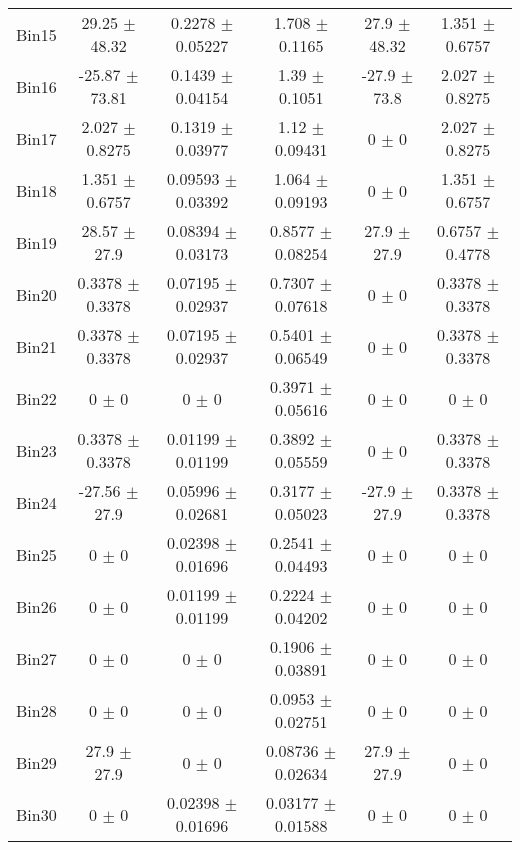 \begin{tabular}{@{\extracolsep{4pt}}lccccc@{}}
     Bin15 & 29.25 $\pm$ 48.32 & 0.2278 $\pm$ 0.05227 & 1.708 $\pm$ 0.1165 & 27.9 $\pm$ 48.32 & 1.351 $\pm$ 0.6757 \\ 
     Bin16 & -25.87 $\pm$ 73.81 & 0.1439 $\pm$ 0.04154 & 1.39 $\pm$ 0.1051 & -27.9 $\pm$ 73.8 & 2.027 $\pm$ 0.8275 \\ 
     Bin17 & 2.027 $\pm$ 0.8275 & 0.1319 $\pm$ 0.03977 & 1.12 $\pm$ 0.09431 & 0 $\pm$ 0 & 2.027 $\pm$ 0.8275 \\ 
     Bin18 & 1.351 $\pm$ 0.6757 & 0.09593 $\pm$ 0.03392 & 1.064 $\pm$ 0.09193 & 0 $\pm$ 0 & 1.351 $\pm$ 0.6757 \\ 
     Bin19 & 28.57 $\pm$ 27.9 & 0.08394 $\pm$ 0.03173 & 0.8577 $\pm$ 0.08254 & 27.9 $\pm$ 27.9 & 0.6757 $\pm$ 0.4778 \\ 
     Bin20 & 0.3378 $\pm$ 0.3378 & 0.07195 $\pm$ 0.02937 & 0.7307 $\pm$ 0.07618 & 0 $\pm$ 0 & 0.3378 $\pm$ 0.3378 \\ 
     Bin21 & 0.3378 $\pm$ 0.3378 & 0.07195 $\pm$ 0.02937 & 0.5401 $\pm$ 0.06549 & 0 $\pm$ 0 & 0.3378 $\pm$ 0.3378 \\ 
     Bin22 & 0 $\pm$ 0 & 0 $\pm$ 0 & 0.3971 $\pm$ 0.05616 & 0 $\pm$ 0 & 0 $\pm$ 0 \\ 
     Bin23 & 0.3378 $\pm$ 0.3378 & 0.01199 $\pm$ 0.01199 & 0.3892 $\pm$ 0.05559 & 0 $\pm$ 0 & 0.3378 $\pm$ 0.3378 \\ 
     Bin24 & -27.56 $\pm$ 27.9 & 0.05996 $\pm$ 0.02681 & 0.3177 $\pm$ 0.05023 & -27.9 $\pm$ 27.9 & 0.3378 $\pm$ 0.3378 \\ 
     Bin25 & 0 $\pm$ 0 & 0.02398 $\pm$ 0.01696 & 0.2541 $\pm$ 0.04493 & 0 $\pm$ 0 & 0 $\pm$ 0 \\ 
     Bin26 & 0 $\pm$ 0 & 0.01199 $\pm$ 0.01199 & 0.2224 $\pm$ 0.04202 & 0 $\pm$ 0 & 0 $\pm$ 0 \\ 
     Bin27 & 0 $\pm$ 0 & 0 $\pm$ 0 & 0.1906 $\pm$ 0.03891 & 0 $\pm$ 0 & 0 $\pm$ 0 \\ 
     Bin28 & 0 $\pm$ 0 & 0 $\pm$ 0 & 0.0953 $\pm$ 0.02751 & 0 $\pm$ 0 & 0 $\pm$ 0 \\ 
     Bin29 & 27.9 $\pm$ 27.9 & 0 $\pm$ 0 & 0.08736 $\pm$ 0.02634 & 27.9 $\pm$ 27.9 & 0 $\pm$ 0 \\ 
     Bin30 & 0 $\pm$ 0 & 0.02398 $\pm$ 0.01696 & 0.03177 $\pm$ 0.01588 & 0 $\pm$ 0 & 0 $\pm$ 0 \\ 
\hline\hline
  \end{tabular}
